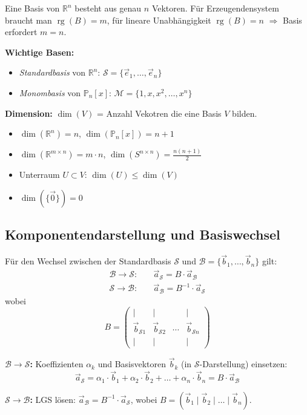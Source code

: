Eine Basis von $\mathbb{R}^n$ besteht aus genau $n$ Vektoren. Für Erzeugendensystem braucht man $\operatorname{rg}(B) = m$, für lineare Unabhängigkeit $\operatorname{rg}(B) = n$ $\Rightarrow$ Basis erfordert $m = n$.

\textbf{Wichtige Basen:}
\begin{itemize}
    \item \emph{Standardbasis} von $\mathbb{R}^n$: $\mathcal{S} = \{\vec{e}_1, \ldots, \vec{e}_n\}$
    \item \emph{Monombasis} von $\mathbb{P}_n[x]$: $\mathcal{M} = \{1, x, x^2, \ldots, x^n\}$
\end{itemize}

\textbf{Dimension:} $\dim(V)$ = Anzahl Vekotren die eine Basis $V$ bilden.
\begin{itemize}
    \item $\dim(\mathbb{R}^n) = n$, \quad $\dim(\mathbb{P}_n[x]) = n + 1$
    \item $\dim(\mathbb{R}^{m \times n}) = m \cdot n$, \quad $\dim(S^{n \times n}) = \frac{n(n+1)}{2}$
    \item Unterraum $U \subset V$: $\dim(U) \leq \dim(V)$
    \item $\dim(\{\vec{0}\}) = 0$
\end{itemize}

\subsection{Komponentendarstellung und Basiswechsel}
Für den Wechsel zwischen der Standardbasis $\mathcal{S}$ und $\mathcal{B} = \{\vec{b}_1, \ldots, \vec{b}_n\}$ gilt:
\begin{align*}
    \mathcal{B} \to \mathcal{S}: \quad &\vec{a}_{\mathcal{S}} = B \cdot \vec{a}_{\mathcal{B}} \\
    \mathcal{S} \to \mathcal{B}: \quad &\vec{a}_{\mathcal{B}} = B^{-1} \cdot \vec{a}_{\mathcal{S}}
\end{align*}
wobei 
\[
B = \begin{pmatrix} | & | & & | \\ \vec{b}_{\mathcal{S}1} & \vec{b}_{\mathcal{S}2} & \cdots & \vec{b}_{\mathcal{S}n} \\ | & | & & | \end{pmatrix}
\]


\textbf{$\mathcal{B} \to \mathcal{S}$:} Koeffizienten $\alpha_k$ und Basisvektoren $\vec{b}_k$ (in $\mathcal{S}$-Darstellung) einsetzen:
\[
    \vec{a}_{\mathcal{S}} = \alpha_1 \cdot \vec{b}_1 + \alpha_2 \cdot \vec{b}_2 + \ldots + \alpha_n \cdot \vec{b}_n = B \cdot \vec{a}_{\mathcal{B}}
\]

\textbf{$\mathcal{S} \to \mathcal{B}$:} LGS lösen: $\vec{a}_{\mathcal{B}} = B^{-1} \cdot \vec{a}_{\mathcal{S}}$, wobei $B = (\vec{b}_1 \mid \vec{b}_2 \mid \ldots \mid \vec{b}_n)$.

